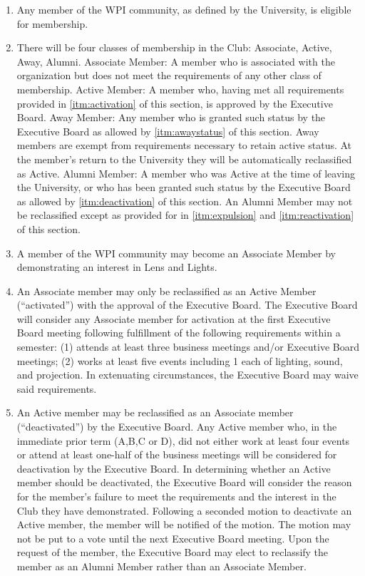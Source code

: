 \documentclass[12pt,letterpaper,oneside]{book}
\begin{document}
\begin{enumerate}

\item \label{itm:wpicommunity} Any member of the WPI community, as defined by the University, is eligible for membership.
\item \label{itm:classesofmembership} There will be four classes of membership in the Club: Associate, Active, Away, Alumni. 
\subitem Associate Member: A member who is associated with the organization but does not meet the requirements of any other class of membership.
\subitem Active Member: A member who, having met all requirements provided in \cref{itm:activation} of this section, is approved by the Executive Board.
\subitem Away Member: Any member who is granted such status by the Executive Board as allowed by \cref{itm:awaystatus} of this section. Away members are exempt from requirements necessary to retain active status. At the member’s return to the University they will be automatically reclassified as Active.
\subitem Alumni Member: A member who was Active at the time of leaving the University, or who has been granted such status by the Executive Board as allowed by \cref{itm:deactivation} of this section. An Alumni Member may not be reclassified except as provided for in \cref{itm:expulsion} and \cref{itm:reactivation} of this section.
\item \label{itm:association} A member of the WPI community may become an Associate Member by demonstrating an interest in Lens and Lights.
\item \label{itm:activation} An Associate member may only be reclassified as an Active Member (“activated”) with the approval of the Executive Board. The Executive Board will consider any Associate member for activation at the first Executive Board meeting following fulfillment of the following requirements within a semester: (1) attends at least three business meetings and/or Executive Board meetings; (2) works at least five events including 1 each of lighting, sound, and projection. In extenuating circumstances, the Executive Board may waive said requirements.
\item \label{itm:deactivation} An Active member may be reclassified as an Associate member (“deactivated”) by the Executive Board. Any Active member who, in the immediate prior term (A,B,C or D), did not either work at least four events or attend at least one-half of the business meetings will be considered for deactivation by the Executive Board. In determining whether an Active member should be deactivated, the Executive Board will consider the reason for the member’s failure to meet the requirements and the interest in the Club they have demonstrated. Following a seconded motion to deactivate an Active member, the member will be notified of the motion. The motion may not be put to a vote until the next Executive Board meeting. Upon the request of the member, the Executive Board may elect to reclassify the member as an Alumni Member rather than an Associate Member.

\end{enumerate}
\end{document}
